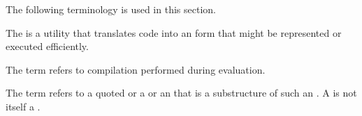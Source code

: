 
%
%   
%
%

\def\sim#1#2#3{{\cal S}\sub{#1}(#2,#3)}


 

 
The following terminology is used in this section.
 
The  is a utility that translates code into an
 form that might be represented or
executed efficiently.

The term  refers to compilation
performed during evaluation.  

The term  refers to 
     a quoted  
  or a  
  or an  that is a substructure of such an .
A  is not itself a .


